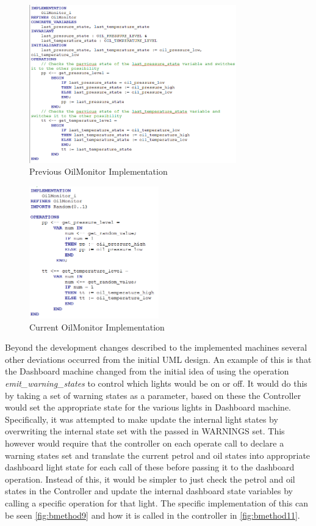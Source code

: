 \documentclass[12pt]{article}
\begin{document}
\begin{figure}
	\centering
	\includegraphics[width=0.8\textwidth]{previous_oil_monitor}
	\caption{Previous OilMonitor Implementation}
	\label{fig:bmethod7}
\end{figure}

\begin{figure}
	\centering
	\includegraphics[width=0.5\textwidth]{current_oil_monitor}
	\caption{Current OilMonitor Implementation}
	\label{fig:bmethod8}
\end{figure}

Beyond the development changes described to the implemented machines several other deviations occurred from the initial UML design. An example of this is that the Dashboard machine changed from the initial idea of using the operation \textit{emit\_warning\_states} to control which lights would be on or off. It would do this by taking a set of warning states as a parameter, based on these the Controller would set the appropriate state for the various lights in Dashboard machine. Specifically, it was attempted to make update the internal light states by overwriting the internal state set with the passed in WARNINGS set. This however would require that the controller on each operate call to declare a warning states set and translate the current petrol and oil states into appropriate dashboard light state for each call of these before passing it to the dashboard operation. Instead of this, it would be simpler to just check the petrol and oil states in the Controller and update the internal dashboard state variables by calling a specific operation for that light. The specific implementation of this can be seen \ref{fig:bmethod9} and how it is called in the controller in \ref{fig:bmethod11}.
\end{document}
